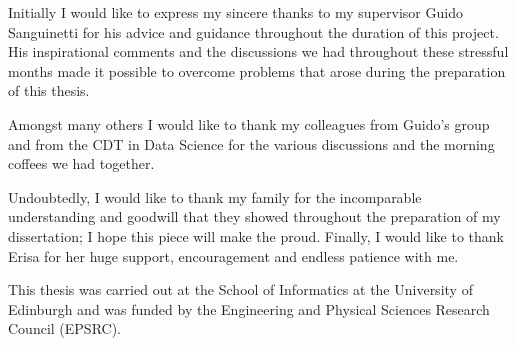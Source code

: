 \begin{acknowledgements}
Initially I would like to express my sincere thanks to my supervisor Guido Sanguinetti for his advice and guidance throughout the duration of this project. His inspirational comments and the discussions we had throughout these stressful months made it possible to overcome problems that arose during the preparation of this thesis.

Amongst many others I would like to thank my colleagues from Guido's group and from the CDT in Data Science for the various discussions and the morning coffees we had together.

Undoubtedly, I would like to thank my family for the incomparable understanding and goodwill that they showed throughout the preparation of my dissertation; I hope this piece will make the proud. Finally, I would like to thank Erisa for her huge support, encouragement and endless patience with me.

This thesis was carried out at the School of Informatics at the University of Edinburgh and was funded by the Engineering and Physical Sciences Research Council (EPSRC).

\end{acknowledgements}